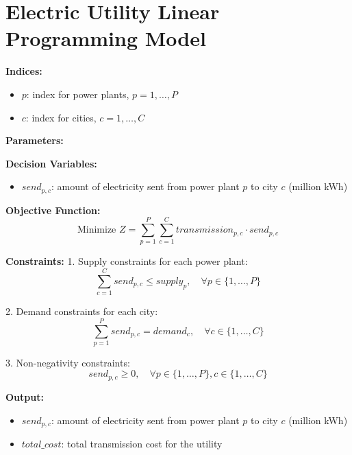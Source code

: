 \documentclass{article}
\begin{document}
\section*{Electric Utility Linear Programming Model}

\textbf{Indices:}
\begin{itemize}
    \item \( p \): index for power plants, \( p = 1, \ldots, P \)
    \item \( c \): index for cities, \( c = 1, \ldots, C \)
\end{itemize}

\textbf{Parameters:}

\textbf{Decision Variables:}
\begin{itemize}
    \item \( send_{p,c} \): amount of electricity sent from power plant \( p \) to city \( c \) (million kWh)
\end{itemize}

\textbf{Objective Function:}
\[
\text{Minimize } Z = \sum_{p=1}^{P} \sum_{c=1}^{C} transmission_{p,c} \cdot send_{p,c}
\]

\textbf{Constraints:}
1. Supply constraints for each power plant:
\[
\sum_{c=1}^{C} send_{p,c} \leq supply_{p}, \quad \forall p \in \{1, \ldots, P\}
\]

2. Demand constraints for each city:
\[
\sum_{p=1}^{P} send_{p,c} = demand_{c}, \quad \forall c \in \{1, \ldots, C\}
\]

3. Non-negativity constraints:
\[
send_{p,c} \geq 0, \quad \forall p \in \{1, \ldots, P\}, c \in \{1, \ldots, C\}
\]

\textbf{Output:}
\begin{itemize}
    \item \( send_{p,c} \): amount of electricity sent from power plant \( p \) to city \( c \) (million kWh)
    \item \( total\_cost \): total transmission cost for the utility
\end{itemize}
\end{document}
